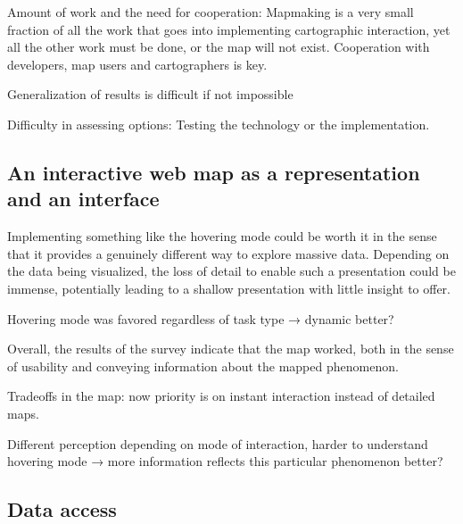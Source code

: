 Amount of work and the need for cooperation:
Mapmaking is a very small fraction of all the work
that goes into implementing cartographic interaction,
yet all the other work must be done,
or the map will not exist.
Cooperation with developers, map users and cartographers is key.


Generalization of results is difficult if not impossible

Difficulty in assessing options: Testing the technology or the implementation.





\subsection{An interactive web map as a representation and an interface}

Implementing something like the hovering mode could be worth it in the sense
that it provides a genuinely different way to explore massive data.
Depending on the data being visualized,
the loss of detail to enable such a presentation could be immense,
potentially leading to a shallow presentation with little insight to offer.

Hovering mode was favored regardless of task type → dynamic better?

Overall, the results of the survey indicate that the map worked,
both in the sense of usability and conveying information about the mapped phenomenon.

Tradeoffs in the map:
now priority is on instant interaction instead of detailed maps.

Different perception depending on mode of interaction,
harder to understand hovering mode →
more information reflects this particular phenomenon better?


\subsection{Data access}


